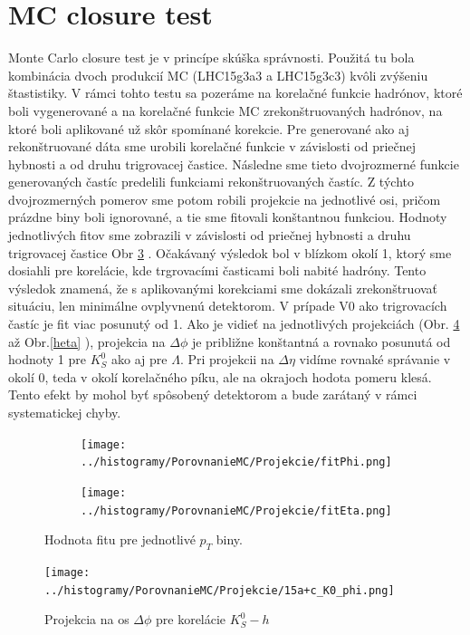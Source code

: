 \documentclass[thesismargins, thesislinespacing]{rnthesis}
\begin{document}
\section{MC closure test}

Monte Carlo closure test je v princípe skúška správnosti. Použitá tu bola kombinácia dvoch produkcií MC (LHC15g3a3 a LHC15g3c3) kvôli zvýšeniu štastistiky. V rámci tohto testu sa pozeráme na korelačné funkcie hadrónov, ktoré boli vygenerované a na korelačné funkcie MC zrekonštruovaných hadrónov, na ktoré boli aplikované už skôr spomínané korekcie. Pre generované ako aj rekonštruované dáta sme urobili korelačné funkcie v závislosti od priečnej hybnosti  a od druhu trigrovacej častice. Následne sme tieto dvojrozmerné funkcie generovaných častíc predelili funkciami rekonštruovaných častíc. Z týchto dvojrozmerných pomerov sme potom robili projekcie na jednotlivé osi, pričom prázdne biny boli ignorované, a tie sme fitovali konštantnou funkciou. Hodnoty jednotlivých fitov sme zobrazili v závislosti od priečnej hybnosti a druhu trigrovacej častice Obr \ref{fitMC} . Očakávaný výsledok bol v blízkom okolí 1, ktorý sme dosiahli pre korelácie, kde trgrovacími časticami boli nabité hadróny. Tento výsledok znamená, že s aplikovanými korekciami sme dokázali zrekonštruovať situáciu, len minimálne ovplyvnenú detektorom.
V prípade V0 ako trigrovacích častíc je fit viac posunutý od 1. Ako je vidieť na jednotlivých projekciách (Obr. \ref{K0phi}  až Obr.\ref{heta}  ), projekcia na $\Delta \phi$ je približne konštantná a rovnako posunutá od hodnoty 1 pre $K^0_S$ ako aj pre $\Lambda$. Pri projekcii na $\Delta \eta$ vidíme rovnaké správanie v okolí 0, teda v okolí korelačného píku, ale na okrajoch hodota pomeru klesá. Tento efekt by mohol byť spôsobený detektorom a bude zarátaný v rámci systematickej chyby. 

\begin{figure}
	\centering
	\begin{subfigure}{0.5\textwidth}
		\centering
		\texttt{[image: ../histogramy/PorovnanieMC/Projekcie/fitPhi.png]}
		\caption{}
		\label{fitPhi}
	\end{subfigure}%
	\begin{subfigure}{0.5\textwidth}
		\centering
		\texttt{[image: ../histogramy/PorovnanieMC/Projekcie/fitEta.png]}
		\caption{}
		\label{fitEta}
	\end{subfigure}
	\caption{Hodnota fitu pre jednotlivé $p_T$ biny.}
	\label{fitMC}
\end{figure}

\begin{figure}
	\centering
	\texttt{[image: ../histogramy/PorovnanieMC/Projekcie/15a+c\_K0\_phi.png]}
	\caption{Projekcia na os $\Delta \phi$ pre korelácie $K^0_S - h$}
	\label{K0phi}
\end{figure}
\end{document}
